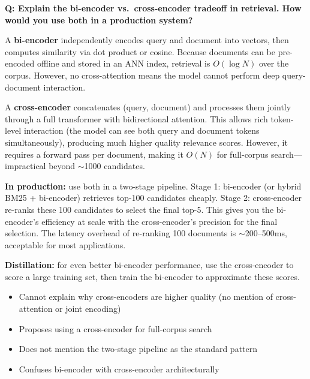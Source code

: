 \begin{interviewq}
\textbf{Q: Explain the bi-encoder vs.\ cross-encoder tradeoff in retrieval.
How would you use both in a production system?}

 \quad {} \quad \badgefreq{\freqhigh}

\stronganswer
A \textbf{bi-encoder} independently encodes query and document into vectors,
then computes similarity via dot product or cosine.  Because documents can be
pre-encoded offline and stored in an ANN index, retrieval is $O(\log N)$ over
the corpus.  However, no cross-attention means the model cannot perform deep
query-document interaction.

A \textbf{cross-encoder} concatenates (query, document) and processes them
jointly through a full transformer with bidirectional attention.  This allows
rich token-level interaction (the model can see both query and document tokens
simultaneously), producing much higher quality relevance scores.  However,
it requires a forward pass per document, making it $O(N)$ for full-corpus
search---impractical beyond $\sim$1000 candidates.

\textbf{In production:} use both in a two-stage pipeline.  Stage 1: bi-encoder
(or hybrid BM25 + bi-encoder) retrieves top-100 candidates cheaply.  Stage 2:
cross-encoder re-ranks these 100 candidates to select the final top-5.  This
gives you the bi-encoder's efficiency at scale with the cross-encoder's
precision for the final selection.  The latency overhead of re-ranking 100
documents is $\sim$200--500ms, acceptable for most applications.

\textbf{Distillation:} for even better bi-encoder performance, use the
cross-encoder to score a large training set, then train the bi-encoder to
approximate these scores.

\redflags
\begin{itemize}
    \item Cannot explain why cross-encoders are higher quality (no mention
          of cross-attention or joint encoding)
    \item Proposes using a cross-encoder for full-corpus search
    \item Does not mention the two-stage pipeline as the standard pattern
    \item Confuses bi-encoder with cross-encoder architecturally
\end{itemize}



\end{interviewq}
